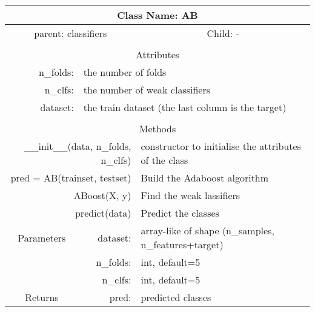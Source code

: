 {\small
\begin{tabular}{llll}
\toprule
\multicolumn{4}{|c|}{Class Name: AB} \\
\midrule
\multicolumn{2}{|c|}{parent: classifiers} &\multicolumn{2}{|c|}{Child: -} \\\bottomrule


\multicolumn{4}{c}{} \\\bottomrule
\multicolumn{4}{|c|}{Attributes} \\\midrule
\multicolumn{1}{|r}{n\_folds: } & \multicolumn{3}{l|}{the number of folds } \\
\multicolumn{1}{|r}{n\_clfs: } & \multicolumn{3}{l|}{the number of weak classifiers } \\
\multicolumn{1}{|r}{dataset: } & \multicolumn{3}{l|}{the train dataset (the last column is the target) } \\\bottomrule


\multicolumn{4}{c}{} \\\bottomrule
\multicolumn{4}{|c|}{Methods} \\\midrule
\multicolumn{2}{|r}{\_\_init\_\_(data, n\_folds, n\_clfs) } & \multicolumn{2}{l|}{constructor to initialise the attributes of the class} \\
\multicolumn{2}{|r}{pred = AB(trainset, testset) } & \multicolumn{2}{l|}{Build the Adaboost algorithm} \\
\multicolumn{2}{|r}{ABoost(X, y) } & \multicolumn{2}{l|}{Find the weak lassifiers } \\
\multicolumn{2}{|r}{predict(data) } & \multicolumn{2}{l|}{Predict the classes} \\ \midrule


\multicolumn{1}{|c|}{Parameters}
& \multicolumn{1}{|r}{dataset:}& \multicolumn{2}{l|}{array-like of shape (n\_samples, n\_features+target)}\\
\multicolumn{1}{|l|}{} & \multicolumn{1}{|r}{n\_folds:}& \multicolumn{2}{l|}{int, default=5}\\
\multicolumn{1}{|l|}{} & \multicolumn{1}{|r}{n\_clfs:}& \multicolumn{2}{l|}{int, default=5}\\\midrule

\multicolumn{1}{|c|}{Returns} & \multicolumn{1}{|r}{pred:}& \multicolumn{2}{l|}{predicted classes}\\




\bottomrule
\end{tabular}}